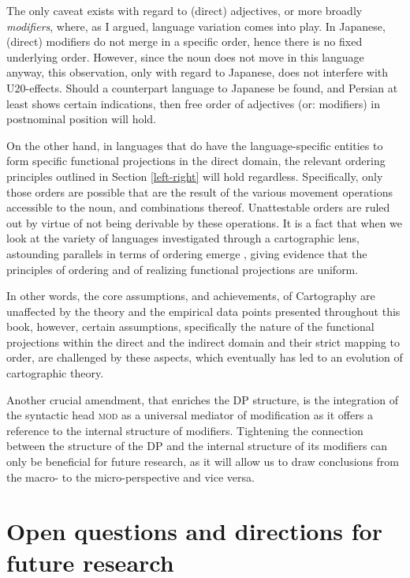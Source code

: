 The only caveat exists with regard to (direct) adjectives, or more broadly \textit{modifiers}, where, as I argued, language variation comes into play. In Japanese, (direct) modifiers do not merge in a specific order, hence there is no fixed underlying order. However, since the noun does not move in this language anyway, this observation, only with regard to Japanese, does not interfere with U20-effects. Should a counterpart language to Japanese be found, and  Persian at least shows certain indications, then free order of adjectives (or: modifiers) in postnominal position will hold.

On the other hand, in languages that do have the language-specific entities to form specific functional projections in the direct domain, the relevant ordering principles outlined in Section \ref{left-right} will hold regardless. Specifically, only those orders are possible that are the result of the various movement operations accessible to the noun, and combinations thereof. Unattestable orders are ruled out by virtue of not being derivable by these operations. It is a fact that when we look at the variety of languages investigated through a cartographic lens, astounding parallels in terms of ordering emerge \citep[§ 2]{cinque:2025:superiority}, giving evidence that the principles of ordering and of realizing functional projections are uniform.  

In other words, the core assumptions, and achievements, of Cartography are unaffected by the theory and the empirical data points presented throughout this book, however, certain assumptions, specifically the nature of the functional projections within the direct and the indirect domain and their strict mapping to order, are challenged by these aspects, which eventually has led to an evolution of cartographic theory.

Another crucial amendment, that enriches the DP structure, is the integration of the syntactic head \textsc{mod} as a universal mediator of modification as it offers a reference to the internal structure of modifiers. Tightening the connection between the structure of the DP and the internal structure of its modifiers can only be beneficial for future research, as it will allow us to draw conclusions from the macro- to the micro-perspective and vice versa.

\section{Open questions and directions for future research}

